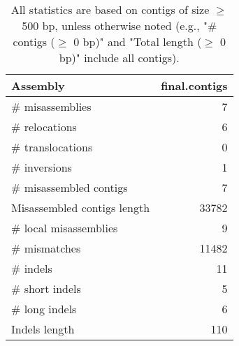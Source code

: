 \documentclass[12pt,a4paper]{article}
\begin{document}
\begin{table}[ht]
\begin{center}
\caption{All statistics are based on contigs of size $\geq$ 500 bp, unless otherwise noted (e.g., "\# contigs ($\geq$ 0 bp)" and "Total length ($\geq$ 0 bp)" include all contigs).}
\begin{tabular}{|l*{1}{|r}|}
\hline
Assembly & final.contigs \\ \hline
\# misassemblies & 7 \\ \hline
\hspace{5mm}\# relocations & 6 \\ \hline
\hspace{5mm}\# translocations & 0 \\ \hline
\hspace{5mm}\# inversions & 1 \\ \hline
\# misassembled contigs & 7 \\ \hline
Misassembled contigs length & 33782 \\ \hline
\# local misassemblies & 9 \\ \hline
\# mismatches & 11482 \\ \hline
\# indels & 11 \\ \hline
\hspace{5mm}\# short indels & 5 \\ \hline
\hspace{5mm}\# long indels & 6 \\ \hline
Indels length & 110 \\ \hline
\end{tabular}
\end{center}
\end{table}
\end{document}
